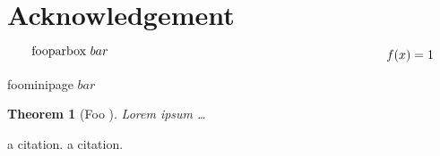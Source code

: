 \documentclass{article}
\newtheorem{theorem}{Theorem}
\begin{document}
\section*{Acknowledgement}

\begin{equation}
  \parbox[c][1pt][b]{10cm}{fooparbox $bar$}
  f(x) = 1
\end{equation}

\begin{minipage}[c][1pt][b]{10cm}
  foominipage $bar$
\end{minipage}

\begin{theorem}[Foo {\cite[Theorem 1.1]{Bar}}]
  Lorem ipsum \dots
\end{theorem}

\begin{thebibliography}{1}
   a citation.
   a citation.
\end{thebibliography}
\end{document}
